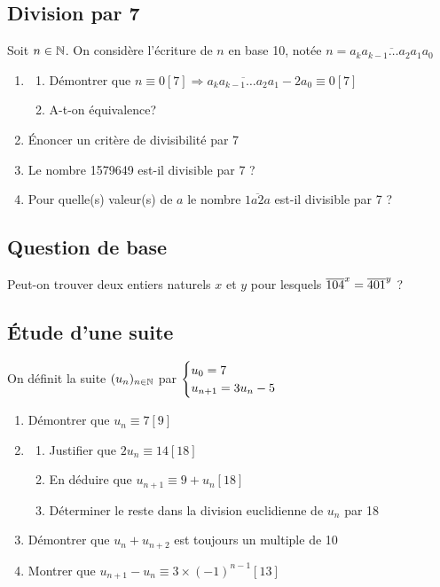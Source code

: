 \documentclass[oneside,12pt]{book}          %
\begin{document}
\subsection{Division par 7}
Soit ${n\in\mathbb N}$. On considère l'écriture de $n$ en base 10, notée $n=\overline{a_ka_{k-1}\ldots a_2a_1a_0}$
\begin{enumerate}
	\item \begin{enumerate}
		\item Démontrer que $n\equiv 0[7] \Longrightarrow \overline{a_ka_{k-1}\ldots a_2a_1}-2a_0\equiv0[7]$
		\item A-t-on équivalence?
\end{enumerate}	 
	\item Énoncer un critère de divisibilité par 7
	\item Le nombre 1579649 est-il divisible par 7 ?
	\item Pour quelle(s) valeur(s) de $a$ le nombre $\overline{1a2a}$ est-il divisible par 7 ?
\end{enumerate}



\subsection{Question de base}

Peut-on trouver deux entiers naturels $x$ et $y$ pour lesquels ${\overline{104}}^x={\overline{401}}^y$ ?



\subsection{Étude d'une suite}
On définit la suite ${(u_{n})_{n\in\mathbb N}}$ par $\defsuite{u_0=7}{3u_n-5}$
\begin{enumerate}
	\item Démontrer que $u_n\equiv7[9]$
	\item\begin{enumerate}
		\item Justifier que $2u_n\equiv14[18]$
		\item En déduire que $u_{n+1}\equiv9+u_n[18]$
		\item Déterminer le reste dans la division euclidienne de $u_n$ par 18
	\end{enumerate}
	\item Démontrer que $u_n+u_{n+2}$ est toujours un multiple de 10
	\item Montrer que $u_{n+1}-u_n\equiv3\times(-1)^{n-1}[13]$
\end{enumerate}
\end{document}
